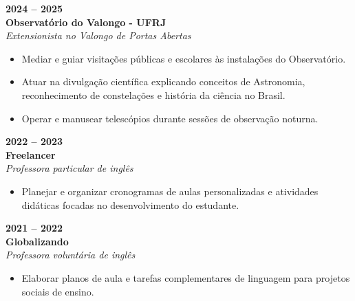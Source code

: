 \documentclass[%
               doublesided,
               paper=a4,
               fontsize=10pt
              ]{my-resume}
\begin{document}
{    \vspace{0.6em}

    \textbf{2024 -- 2025} \\
    \textbf{Observatório do Valongo - UFRJ} \\
    \textit{Extensionista no Valongo de Portas Abertas} \\
    \vspace{-0.4cm}
    \begin{itemize}[leftmargin=0.4cm, topsep=0pt, itemsep=2pt]
        \item \small Mediar e guiar visitações públicas e escolares às instalações do Observatório.
        \item \small Atuar na divulgação científica explicando conceitos de Astronomia, reconhecimento de constelações e história da ciência no Brasil.
        \item \small Operar e manusear telescópios durante sessões de observação noturna.
    \end{itemize}

    \vspace{0.6em}
    
    \textbf{2022 -- 2023} \\
    \textbf{Freelancer} \\
    \textit{Professora particular de inglês} \\
    \vspace{-0.4cm}
    \begin{itemize}[leftmargin=0.4cm, topsep=0pt, itemsep=2pt]
        \item \small Planejar e organizar cronogramas de aulas personalizadas e atividades didáticas focadas no desenvolvimento do estudante.
    \end{itemize}
    
    \vspace{0.6em}
    
    \textbf{2021 -- 2022} \\
    \textbf{Globalizando} \\
    \textit{Professora voluntária de inglês} \\
    \vspace{-0.4cm}
    \begin{itemize}[leftmargin=0.4cm, topsep=0pt, itemsep=2pt]
        \item \small Elaborar planos de aula e tarefas complementares de linguagem para projetos sociais de ensino.
    \end{itemize}

}
\end{document}
